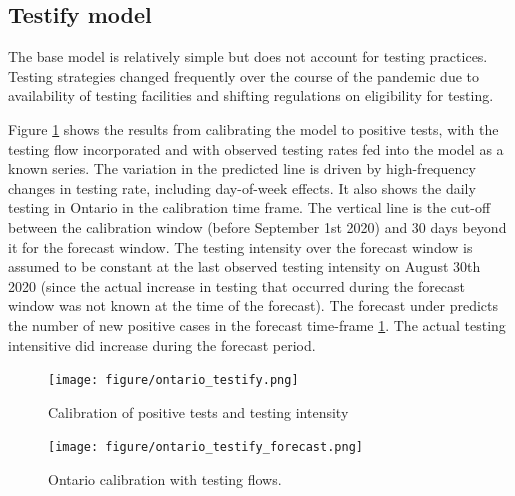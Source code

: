 \documentclass[12pt]{article}\usepackage[]{graphicx}\usepackage[]{color}
\begin{document}
\FloatBarrier

\subsection{Testify model}

The base model is relatively simple but does not account for testing practices. Testing strategies changed frequently over the course of the pandemic due to availability of testing facilities and shifting regulations on eligibility for testing.

Figure \ref{fig:Ont_calibration_testify} shows the results from calibrating the model to positive tests, with the testing flow incorporated and with observed testing rates fed into the model as a known series.
The variation in the predicted line is driven by high-frequency changes in testing rate, including day-of-week effects.
It also shows the daily testing in Ontario in the calibration time frame. The vertical line is the cut-off between the calibration window (before September 1st 2020) and 30 days beyond it for the forecast window. The testing intensity over the forecast window is assumed to be constant at the last observed testing intensity on August 30th 2020 (since the actual increase in testing that occurred during the forecast window was not known at the time of the forecast). The forecast under predicts the number of new positive cases in the forecast time-frame \ref{fig:Ont_calibration_testify}. The actual testing intensitive did increase during the forecast period. 


\begin{figure}[ht!]
\texttt{[image: figure/ontario\_testify.png]}

\caption{Calibration of positive tests and testing intensity}
\label{fig:Ont_calibration_testify}
\end{figure}

\begin{figure}[ht!]
\texttt{[image: figure/ontario\_testify\_forecast.png]}

\caption{Ontario calibration with testing flows. }
\label{fig:Ont_calibration_testify_forecast}
\end{figure}

\end{document}
